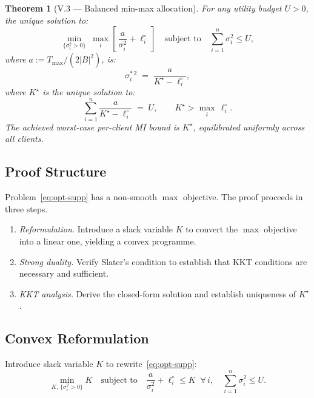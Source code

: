 \documentclass[letterpaper,journal]{IEEEtran}
\newtheorem*{theoremstar}{Theorem}
\newcommand{\Tmax}{T_{\max}}
\begin{document}
\begin{theoremstar}[V.3 \textnormal{---} Balanced min-max
allocation]
For any utility budget $U > 0$, the unique solution to:
\begin{equation}
\min_{\{\sigma_i^2 > 0\}}\;
\max_i \left[\, \frac{a}{\sigma_i^2} + \ell_i^\circ \,\right]
\quad \text{subject to} \quad
\sum_{i=1}^n \sigma_i^2 \leq U,
\label{eq:opt-supp}
\end{equation}
where $a := \Tmax/(2|B|^2)$, is:
\[
\sigma_i^{*\,2} \;=\; \frac{a}{K^\star - \ell_i^\circ},
\]
where $K^\star$ is the unique solution to:
\begin{equation}
\sum_{i=1}^n \frac{a}{K^\star - \ell_i^\circ} \;=\; U,
\qquad K^\star > \max_i\,\ell_i^\circ.
\label{eq:budget-supp}
\end{equation}
The achieved worst-case per-client MI bound is $K^\star$,
equilibrated uniformly across all clients.
\end{theoremstar}

\subsection{Proof Structure}

\noindent Problem~\eqref{eq:opt-supp} has a non-smooth $\max$ objective.
The proof proceeds in three steps.

\begin{enumerate}
\item \textit{Reformulation.} Introduce a slack variable $K$
      to convert the $\max$ objective into a linear one, yielding
      a convex programme.
\item \textit{Strong duality.} Verify Slater's condition to
      establish that KKT conditions are necessary and sufficient.
\item \textit{KKT analysis.} Derive the closed-form solution
      and establish uniqueness of $K^\star$.
\end{enumerate}

\subsection{Convex Reformulation}

\noindent Introduce slack variable $K$ to rewrite~\eqref{eq:opt-supp}:
\begin{equation}
\min_{K,\,\{\sigma_i^2 > 0\}} K
\quad\text{subject to}\quad
\frac{a}{\sigma_i^2} + \ell_i^\circ \leq K \;\;\forall\, i,
\quad \sum_{i=1}^n \sigma_i^2 \leq U.
\label{eq:opt-reform-supp}
\end{equation}
\end{document}
